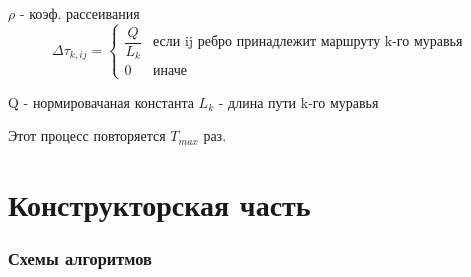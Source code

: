 \documentclass[12pt]{report}
\begin{document}
	$\rho$ - коэф. рассеивания
	\begin{displaymath}
	\Delta\tau_{k,ij} = \left\{ \begin{array}{ll}
	\dfrac{Q}{L_{k}}
	& \textrm{если ij ребро принадлежит маршруту k-го муравья}\\ 
	0 & \textrm{иначе}
	\end{array} \right.
	\end{displaymath}
	
	Q - нормировачаная константа
	$L_{k}$ - длина пути k-го муравья

	Этот процесс повторяется $T_{max}$ раз.
	\chapter{Конструкторская часть}
	\subsection{Схемы алгоритмов}
\end{document}
